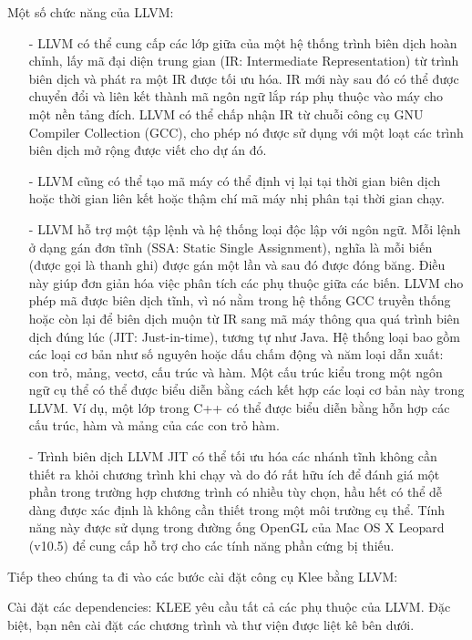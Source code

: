 \documentclass[12pt,a4paper]{report}
\begin{document}
Một số chức năng của LLVM:

\begin{enumerate}
\item[-] LLVM có thể cung cấp các lớp giữa của một hệ thống trình biên dịch hoàn chỉnh, lấy mã đại diện trung gian (IR: Intermediate Representation) từ trình biên dịch và phát ra một IR được tối ưu hóa. IR mới này sau đó có thể được chuyển đổi và liên kết thành mã ngôn ngữ lắp ráp phụ thuộc vào máy cho một nền tảng đích. LLVM có thể chấp nhận IR từ chuỗi công cụ GNU Compiler Collection (GCC), cho phép nó được sử dụng với một loạt các trình biên dịch mở rộng được viết cho dự án đó.

\item[-] LLVM cũng có thể tạo mã máy có thể định vị lại tại thời gian biên dịch hoặc thời gian liên kết hoặc thậm chí mã máy nhị phân tại thời gian chạy.

\item[-] LLVM hỗ trợ một tập lệnh và hệ thống loại độc lập với ngôn ngữ. Mỗi lệnh ở dạng gán đơn tĩnh (SSA: Static Single Assignment), nghĩa là mỗi biến (được gọi là thanh ghi) được gán một lần và sau đó được đóng băng. Điều này giúp đơn giản hóa việc phân tích các phụ thuộc giữa các biến. LLVM cho phép mã được biên dịch tĩnh, vì nó nằm trong hệ thống GCC truyền thống hoặc còn lại để biên dịch muộn từ IR sang mã máy thông qua quá trình biên dịch đúng lúc (JIT: Just-in-time), tương tự như Java. Hệ thống loại bao gồm các loại cơ bản như số nguyên hoặc dấu chấm động và năm loại dẫn xuất: con trỏ, mảng, vectơ, cấu trúc và hàm. Một cấu trúc kiểu trong một ngôn ngữ cụ thể có thể được biểu diễn bằng cách kết hợp các loại cơ bản này trong LLVM. Ví dụ, một lớp trong C++ có thể được biểu diễn bằng hỗn hợp các cấu trúc, hàm và mảng của các con trỏ hàm.

\item[-] Trình biên dịch LLVM JIT có thể tối ưu hóa các nhánh tĩnh không cần thiết ra khỏi chương trình khi chạy và do đó rất hữu ích để đánh giá một phần trong trường hợp chương trình có nhiều tùy chọn, hầu hết có thể dễ dàng được xác định là không cần thiết trong một môi trường cụ thể. Tính năng này được sử dụng trong đường ống OpenGL của Mac OS X Leopard (v10.5) để cung cấp hỗ trợ cho các tính năng phần cứng bị thiếu.
\end{enumerate}

Tiếp theo chúng ta đi vào các bước cài đặt công cụ Klee bằng LLVM:

Cài đặt các dependencies: KLEE yêu cầu tất cả các phụ thuộc của LLVM. Đặc biệt, bạn nên cài đặt các chương trình và thư viện được liệt kê bên dưới.
\end{document}
